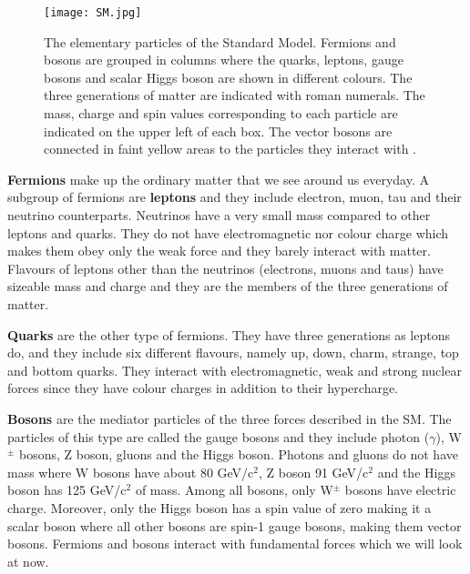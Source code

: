 \vspace{6pt}
\begin{figure}[ht]
	\centering
	\texttt{[image: SM.jpg]}
	\vspace{-0.5cm}
	\vspace{6pt}
	\caption[The elementary particles of the Standard Model. Fermions and bosons are grouped in columns where the quarks, leptons, gauge bosons and scalar Higgs boson are shown in different colours. The three generations of matter are indicated with roman numerals. The mass, charge and spin values corresponding to each particle are indicated on the upper left of each box. The vector bosons are connected in faint yellow areas to the particles they interact with.]{The elementary particles of the Standard Model. Fermions and bosons are grouped in columns where the quarks, leptons, gauge bosons and scalar Higgs boson are shown in different colours. The three generations of matter are indicated with roman numerals. The mass, charge and spin values corresponding to each particle are indicated on the upper left of each box. The vector bosons are connected in faint yellow areas to the particles they interact with \cite{SM-ref}.}
	\label{SM-figure}
\end{figure}

\textbf{Fermions} make up the ordinary matter that we see around us everyday. A subgroup of fermions are \textbf{leptons} and they include electron, muon, tau and their neutrino counterparts. Neutrinos have a very small mass compared to other leptons and quarks. They do not have electromagnetic nor colour charge which makes them obey only the weak force and they barely interact with matter. Flavours of leptons other than the neutrinos (electrons, muons and taus) have sizeable mass and charge and they are the members of the three generations of matter.

\textbf{Quarks} are the other type of fermions. They have three generations as leptons do, and they include six different flavours, namely up, down, charm, strange, top and bottom quarks. They interact with electromagnetic, weak and strong nuclear forces since they have colour charges in addition to their hypercharge. 

\textbf{Bosons} are the mediator particles of the three forces described in the SM. The particles of this type are called the gauge bosons and they include photon ($\gamma$), W$^{\pm}$ bosons, Z boson, gluons and the Higgs boson. Photons and gluons do not have mass where W bosons have about 80 GeV/c$^{2}$, Z boson 91 GeV/c$^{2}$ and the Higgs boson has 125 GeV/c$^{2}$ of mass. Among all bosons, only W$^{\pm}$ bosons have electric charge. Moreover, only the Higgs boson has a spin value of zero making it a scalar boson where all other bosons are spin-1 gauge bosons, making them vector bosons. Fermions and bosons interact with fundamental forces which we will look at now.

